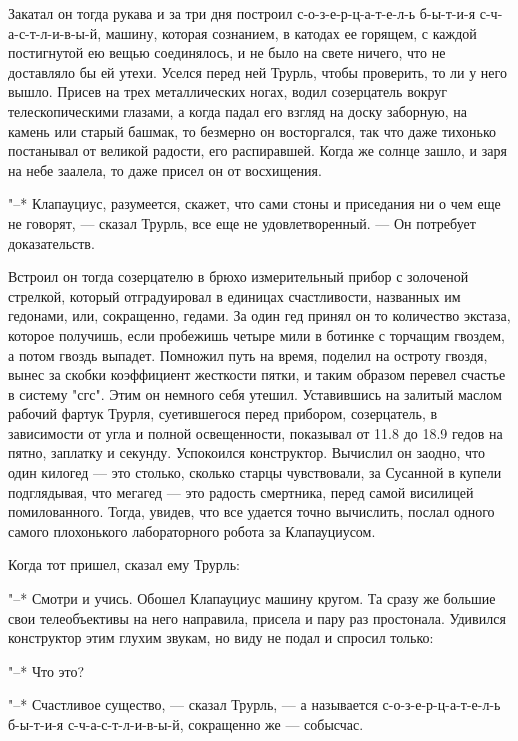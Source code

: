 Закатал он тогда рукава и за три дня построил
с-о-з-е-р-ц-а-т-е-л-ь б-ы-т-и-я с-ч-а-с-т-л-и-в-ы-й, машину,
которая сознанием, в катодах ее горящем, с каждой
постигнутой ею вещью соединялось, и не было на свете ничего,
что не доставляло бы ей утехи. Уселся перед ней Трурль,
чтобы проверить, то ли у него вышло. Присев на трех
металлических ногах, водил созерцатель вокруг
телескопическими глазами, а когда падал его взгляд на доску
заборную, на камень или старый башмак, то безмерно он
восторгался, так что даже тихонько постанывал от великой
радости, его распиравшей. Когда же солнце зашло, и заря на
небе заалела, то даже присел он от восхищения.

"--* Клапауциус, разумеется, скажет, что сами стоны и
приседания ни о чем еще не говорят, --- сказал Трурль, все
еще не удовлетворенный. --- Он потребует доказательств.

Встроил он  тогда созерцателю  в брюхо  измерительный прибор
с  золоченой  стрелкой,  который  отградуировал  в  единицах
счастливости,  названных   им  гедонами,   или,  сокращенно,
гедами. За один гед принял он то количество экстаза, которое
получишь, если  пробежишь четыре  мили в ботинке  с торчащим
гвоздем,  а потом  гвоздь выпадет.  Помножил путь  на время,
поделил  на  остроту  гвоздя, вынес  за  скобки  коэффициент
жесткости пятки,  и таким образом перевел  счастье в систему
"сгс". Этим  он немного себя утешил.  Уставившись на залитый
маслом рабочий  фартук Трурля, суетившегося  перед прибором,
созерцатель, в  зависимости от  угла и  полной освещенности,
показывал  от  11.8  до  18.9 гедов  на  пятно,  заплатку  и
секунду.  Успокоился конструктор.  Вычислил  он заодно,  что
один килогед --- это столько, сколько старцы чувствовали, за
Сусанной в  купели подглядывая, что мегагед  --- это радость
смертника,  перед  самой   висилицей  помилованного.  Тогда,
увидев,  что  все  удается точно  вычислить,  послал  одного
самого плохонького лабораторного робота за Клапауциусом.

Когда тот пришел, сказал ему Трурль:

"--* Смотри и учись. Обошел Клапауциус машину кругом. Та
сразу же большие свои телеобъективы на него направила,
присела и пару раз простонала. Удивился конструктор этим
глухим звукам, но виду не подал и спросил только:

"--* Что это?

"--* Счастливое существо, --- сказал Трурль, --- а называется
с-о-з-е-р-ц-а-т-е-л-ь б-ы-т-и-я с-ч-а-с-т-л-и-в-ы-й,
сокращенно же --- собысчас.

